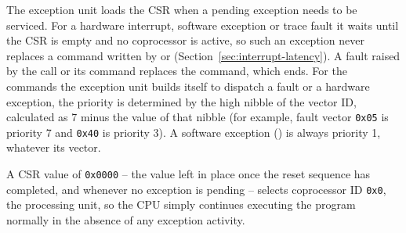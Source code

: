 The exception unit loads the CSR when a pending exception needs to be serviced. For a hardware interrupt, software
exception or trace fault it waits until the CSR is empty and no coprocessor is active, so such an exception never
replaces a command written by  or  (Section~\ref{sec:interrupt-latency}). A fault raised
by the call or its command replaces the command, which ends. For the commands the exception unit builds itself to
dispatch a fault or a hardware exception, the priority is determined by the high nibble of the vector ID, calculated as
7 minus the value of that nibble (for example, fault vector \texttt{0x05} is priority 7 and \texttt{0x40} is priority
3). A software exception () is always priority 1, whatever its vector.

A CSR value of \texttt{0x0000} -- the value left in place once the reset sequence has completed, and whenever no
exception is pending -- selects coprocessor ID \texttt{0x0}, the processing unit, so the CPU simply continues executing
the program normally in the absence of any exception activity.
